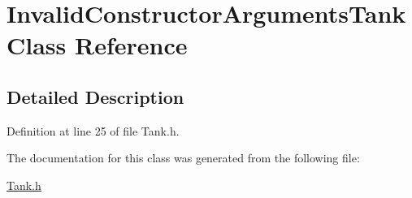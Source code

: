 \hypertarget{class_invalid_constructor_arguments_tank}{\section{Invalid\+Constructor\+Arguments\+Tank Class Reference}
\label{class_invalid_constructor_arguments_tank}
}


\subsection{Detailed Description}


Definition at line 25 of file Tank.\+h.



The documentation for this class was generated from the following file\+:\begin{DoxyCompactItemize}
\item 
\hyperlink{_tank_8h}{Tank.\+h}\end{DoxyCompactItemize}
